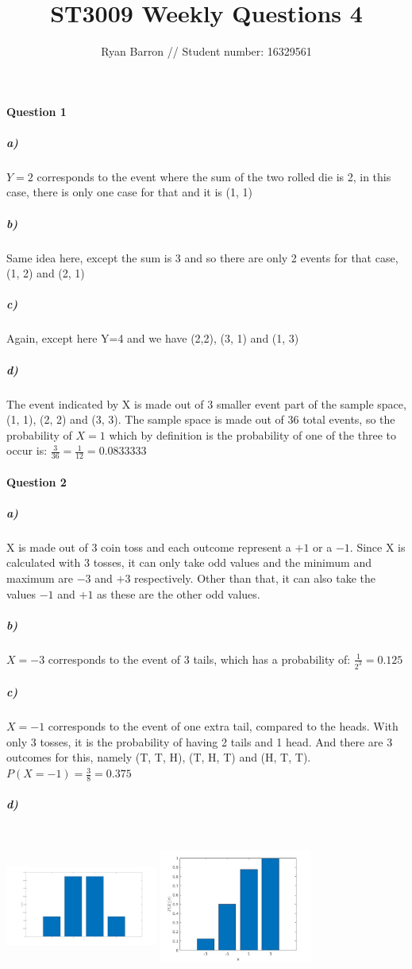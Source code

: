 \documentclass{article}
\title{ST3009 Weekly Questions 4}
\author{Ryan Barron // Student number: 16329561}
\date{}
\begin{document}
\maketitle

\paragraph{Question 1}
\subparagraph{a)}
$Y=2$ corresponds to the event where the sum of the two rolled die is 2, in this case, there is only one case for that and it is (1, 1)
\subparagraph{b)}
Same idea here, except the sum is 3 and so there are only 2 events for that case, (1, 2) and (2, 1)
\subparagraph{c)}
Again, except here Y=4 and we have (2,2), (3, 1) and (1, 3)
\subparagraph{d)}
The event indicated by X is made out of 3 smaller event part of the sample space, (1, 1), (2, 2) and (3, 3). The sample space is made out of 36 total events, so the probability of $X=1$ which by definition is the probability of one of the three to occur is: $\frac{3}{36} = \frac{1}{12} = 0.0833333$

\paragraph{Question 2}
\subparagraph{a)}
X is made out of 3 coin toss and each outcome represent a $+1$ or a $-1$. Since X is calculated with 3 tosses, it can only take odd values and the minimum and maximum are $-3$ and $+3$ respectively. Other than that, it can also take the values $-1$ and $+1$ as these are the other odd values.
\subparagraph{b)}
$X=-3$ corresponds to the event of 3 tails, which has a probability of: $\frac{1}{2^3} = 0.125$
\subparagraph{c)}
$X=-1$ corresponds to the event of one extra tail, compared to the heads. With only 3 tosses, it is the probability of having 2 tails and 1 head. And there are 3 outcomes for this, namely (T, T, H), (T, H, T) and (H, T, T).
$P(X=-1) = \frac{3}{8} = 0.375$
\subparagraph{d)}
\includegraphics[width=5cm, height=5cm]{pmf.jpg}
\includegraphics[width=5cm, height=5cm]{cdf.jpg}
\end{document}
